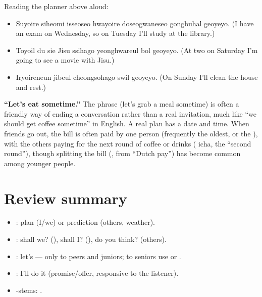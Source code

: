 \begin{example}
Reading the planner above aloud:
\begin{itemize}
  \item {} Suyoire siheomi
        isseoseo hwayoire doseogwaneseo gongbuhal geoyeyo. (I have an exam on Wednesday,
        so on Tuesday I'll study at the library.)
  \item {} Toyoil du sie Jisu ssihago
        yeonghwareul bol geoyeyo. (At two on Saturday I'm going to see a movie with
        Jisu.)
  \item {} Iryoireneun jibeul cheongsohago swil
        geoyeyo. (On Sunday I'll clean the house and rest.)
\end{itemize}
\end{example}

\begin{aside}
\textbf{``Let's eat sometime.''} The phrase  (let's grab a meal
sometime) is often a friendly way of ending a conversation rather than a real
invitation, much like ``we should get coffee sometime'' in English. A real plan has a
date and time. When friends go out, the bill is often paid by one person (frequently the
oldest, or the ), with the others paying for the next round of coffee or drinks
( icha, the ``second round''), though splitting the bill (, from
``Dutch pay'') has become common among younger people.
\end{aside}

\section*{Review summary}
\begin{itemize}
  \item {}: plan (I/we) or prediction (others, weather).
  \item {}: shall we? (), shall I? (), do you think?
        (others).
  \item {}: let's --- only to peers and juniors; to seniors use
         or .
  \item {}: I'll do it (promise/offer, responsive to the listener).
  \item {}-stems: .
\end{itemize}
